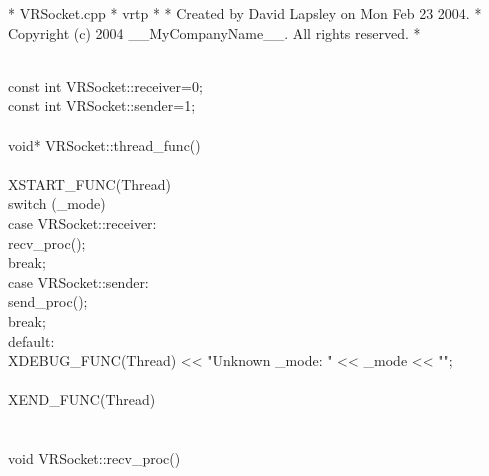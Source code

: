 \documentclass{article}
\begin{document}
 *  VRSocket.cpp
 *  vrtp
 *
 *  Created by David Lapsley on Mon Feb 23 2004.
 *  Copyright (c) 2004 __MyCompanyName__. All rights reserved.
 *
 \strut\goodbreak
{}\strut\nopagebreak\\
 const int VRSocket::receiver=0;
\\
 const int VRSocket::sender=1;
\\
 
\\
 void* VRSocket::thread_func()
\\
 {
\\
         XSTART_FUNC(Thread)
\\
         switch (_mode) {
\\
         case VRSocket::receiver:
\\
                 recv_proc();
\\
                 break;
\\
         case VRSocket::sender:
\\
                 send_proc();
\\
                 break;
\\
         default:
\\
                 XDEBUG_FUNC(Thread) << "Unknown _mode: " << _mode << "\n"; 
\\
         }
\\
         XEND_FUNC(Thread)
\\
 }
\\
 
\\
 void VRSocket::recv_proc()
\\
\end{document}
